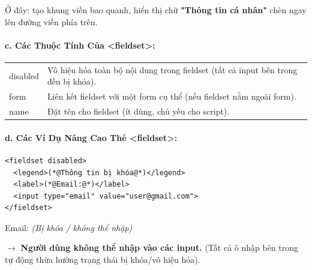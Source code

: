 \begin{noteBox}
Ở đây:  tạo khung viền bao quanh,  hiển thị chữ \textbf{"Thông tin cá nhân"} chèn ngay lên đường viền phía trên.
\end{noteBox}

\paragraph{c. Các Thuộc Tính Của <fieldset>:}
\begin{prettyTableBox}
\begin{tabularx}{\linewidth}{|K{3cm}|Z|}
\hline
{}  &  \\
\hline
disabled & Vô hiệu hóa toàn bộ nội dung trong fieldset (tất cả input bên trong đều bị khóa). \\
\hline
form & Liên kết fieldset với một form cụ thể (nếu fieldset nằm ngoài form). \\
\hline
name & Đặt tên cho fieldset (ít dùng, chủ yếu cho script). \\
\hline
\end{tabularx}
\end{prettyTableBox}

\paragraph{d. Các Ví Dụ Nâng Cao Thẻ <fieldset>:}

\begin{codeWindow}
\begin{lstlisting}[language=HTML5]
<fieldset disabled>
  <legend>(*@Thông tin bị khóa@*)</legend>
  <label>(*@Email:@*)</label>
  <input type="email" value="user@gmail.com">
</fieldset>
\end{lstlisting}
\end{codeWindow}

\begin{browserWindow}
\begin{tcolorbox}[
    enhanced, colback=gray!8, colframe=gray!50, boxrule=0.6pt, arc=0pt,
    top=10pt, bottom=10pt, left=10pt, right=10pt,
    coltitle=gray!70,
    title={\sffamily\small\color{gray!70} Thông tin bị khóa},
    attach boxed title to top left={xshift=10pt, yshift=-6pt},
    boxed title style={colback=gray!8, colframe=gray!8, boxrule=0pt, left=3pt, right=3pt, top=0pt, bottom=0pt}
]
\sffamily\small
\textcolor{gray!70}{Email:} \quad {} \quad \textcolor{gray!60}{\small\textit{(Bị khóa / không thể nhập)}}
\end{tcolorbox}
\end{browserWindow}
\textcolor{primaryBlue}{\textbf{$\rightarrow$}} \textbf{Người dùng không thể nhập vào các input.} (Tất cả ô nhập bên trong tự động thừa hưởng trạng thái bị khóa/vô hiệu hóa).

